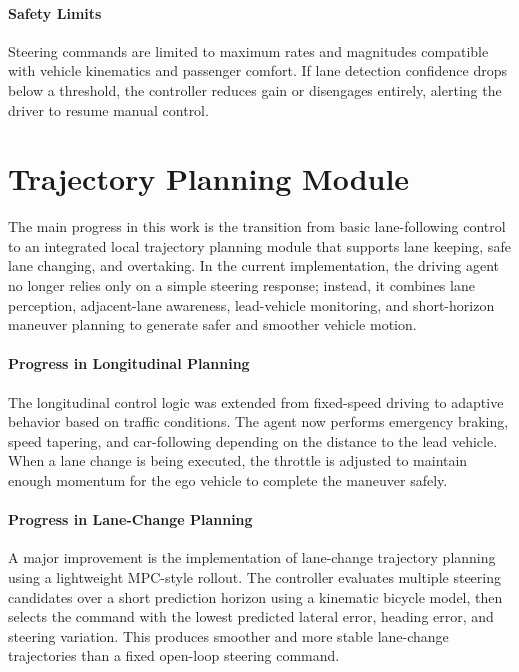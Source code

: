 \documentclass[12pt, a4paper]{report}
\begin{document}
\paragraph{Safety Limits}

Steering commands are limited to maximum rates and magnitudes compatible with vehicle kinematics and passenger comfort. If lane detection confidence drops below a threshold, the controller reduces gain or disengages entirely, alerting the driver to resume manual control.

\section{Trajectory Planning Module}

The main progress in this work is the transition from basic lane-following control to an integrated local trajectory planning module that supports lane keeping, safe lane changing, and overtaking. In the current implementation, the driving agent no longer relies only on a simple steering response; instead, it combines lane perception, adjacent-lane awareness, lead-vehicle monitoring, and short-horizon maneuver planning to generate safer and smoother vehicle motion.

\paragraph{Progress in Longitudinal Planning}

The longitudinal control logic was extended from fixed-speed driving to adaptive behavior based on traffic conditions. The agent now performs emergency braking, speed tapering, and car-following depending on the distance to the lead vehicle. When a lane change is being executed, the throttle is adjusted to maintain enough momentum for the ego vehicle to complete the maneuver safely.

\paragraph{Progress in Lane-Change Planning}

A major improvement is the implementation of lane-change trajectory planning using a lightweight MPC-style rollout. The controller evaluates multiple steering candidates over a short prediction horizon using a kinematic bicycle model, then selects the command with the lowest predicted lateral error, heading error, and steering variation. This produces smoother and more stable lane-change trajectories than a fixed open-loop steering command.
\end{document}
